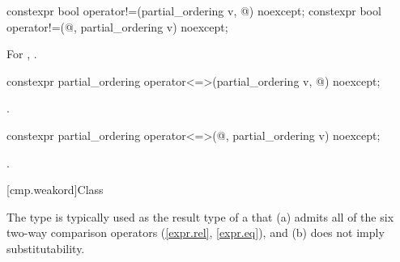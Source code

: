 %
\begin{itemdecl}
constexpr bool operator!=(partial_ordering v, @\unspec@) noexcept;
constexpr bool operator!=(@\unspec@, partial_ordering v) noexcept;
\end{itemdecl}

\begin{itemdescr}
\pnum
\returns
For , .
\end{itemdescr}

%
\begin{itemdecl}
constexpr partial_ordering operator<=>(partial_ordering v, @\unspec@) noexcept;
\end{itemdecl}

\begin{itemdescr}
\pnum
\returns
{}.
\end{itemdescr}

%
\begin{itemdecl}
constexpr partial_ordering operator<=>(@\unspec@, partial_ordering v) noexcept;
\end{itemdecl}

\begin{itemdescr}
\pnum
\returns
{}.
\end{itemdescr}

[cmp.weakord]{Class }

\pnum
The  type is typically used
as the result type of a 
that (a) admits all of the six two-way comparison operators (\ref{expr.rel}, \ref{expr.eq}),
and (b) does not imply substitutability.

